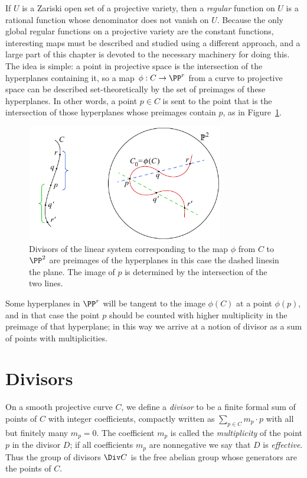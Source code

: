 If $U$ is a Zariski open set of a projective variety, then a \emph{regular} function on $U$
is a rational function whose denominator does not vanish on $U$.
Because the only global regular functions on a projective variety are the  constant functions,
interesting maps must be described and studied using
a different approach, and a large part of this chapter is devoted to the necessary machinery for doing this. The idea is simple: a point in projective space is the intersection of the hyperplanes containing it, so a map $\phi: C\to \PP^r$ from a curve to projective space can be described set-theoretically
%
by the set of preimages of these hyperplanes.
In other words, a point $p\in C$ is sent to the point
that is the intersection of those hyperplanes whose preimages contain $p$, as in Figure~\ref{set-theoretic map}.

\begin{figure}[b]
\centerline {\includegraphics[height=2in]{"main/Fig01-1"}}
 \caption{Divisors of the linear system corresponding to the map
   $\phi$ from $C$
to $\PP^2$ are preimages of the hyperplanes\emdash
   in this case the dashed lines\emdash in the plane.
 The image of $p$ is determined by the intersection of the two lines.
}
\label{set-theoretic map}
\end{figure}


Some hyperplanes in $\PP^{r}$ will be tangent to the image $\phi(C)$ at a point $\phi(p)$, and in that case the point $p$ should be counted with higher multiplicity in the preimage of that hyperplane; in
this way we arrive at a notion of divisor as a sum of points with multiplicities.

\section{Divisors}

On a smooth projective curve $C$, we define a \emph{divisor} to be a
finite formal sum of points of $C$ with integer coefficients,
compactly written
as $\sum_{p\in C} m_p\cdot p$ with all but
finitely many $m_p=0$.  The coefficient $m_p$ is called the
\emph{multiplicity} of the point $p$ in the divisor $D$; if all
coefficients $m_p$ are nonnegative we say that $D$ is
\emph{effective}. Thus the group of divisors $\Div C$ is the free
abelian group whose generators
%
%
%
are the points of $C$.


